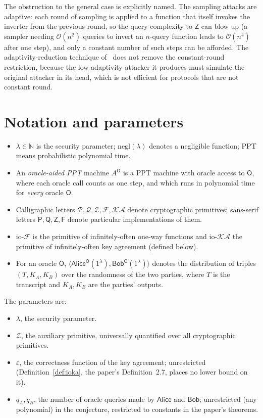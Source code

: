 \documentclass{aicr-conjecture}
\newcommand{\negl}{\mathrm{negl}}
\newcommand{\iopref}{\mathrm{io}\text{-}}
\newcommand{\Fc}{\mathcal{F}}
\newcommand{\KAc}{\mathcal{KA}}
\newcommand{\ioF}{\iopref\Fc}
\newcommand{\ioKA}{\iopref\KAc}
\newcommand{\Zc}{\mathcal{Z}}
\newcommand{\Pc}{\mathcal{P}}
\newcommand{\Qc}{\mathcal{Q}}
\newcommand{\Oc}{\mathsf{O}}
\newcommand{\Fs}{\mathsf{F}}
\newcommand{\Ps}{\mathsf{P}}
\newcommand{\Qs}{\mathsf{Q}}
\newcommand{\Zs}{\mathsf{Z}}
\newcommand{\Alice}{\mathsf{Alice}}
\newcommand{\Bob}{\mathsf{Bob}}
\newcommand{\kaexec}{\langle\Alice^{\Oc}(1^{\lambda}),\Bob^{\Oc}(1^{\lambda})\rangle}
\begin{document}
The obstruction to the general case is explicitly named. The sampling
attacks are adaptive: each round of sampling is applied to a function
that itself invokes the inverter from the previous round, so the query
complexity to $\Zs$ can blow up (a sampler needing $\mathcal O(n^2)$
queries to invert an $n$-query function leads to $\mathcal O(n^4)$ after
one step), and only a constant number of such steps can be afforded. The
adaptivity-reduction technique of~\cite{MMV11} does not remove the
constant-round restriction, because the low-adaptivity attacker it
produces must simulate the original attacker in its head, which is not
efficient for protocols that are not constant round.

\section{Notation and parameters}\label{sec:notation}

\begin{itemize}
\item $\lambda\in\mathbb{N}$ is the security parameter; $\negl(\lambda)$
  denotes a negligible function; PPT means probabilistic polynomial time.
\item An \emph{oracle-aided PPT} machine $A^{\Oc}$ is a PPT machine with
  oracle access to $\Oc$, where each oracle call counts as one step, and
  which runs in polynomial time for \emph{every} oracle $\Oc$.
\item Calligraphic letters $\Pc,\Qc,\Zc,\Fc,\KAc$ denote cryptographic
  primitives; sans-serif letters $\Ps,\Qs,\Zs,\Fs$ denote particular
  implementations of them.
\item $\ioF$ is the primitive of infinitely-often one-way functions and
  $\ioKA$ the primitive of infinitely-often key agreement (defined
  below).
\item For an oracle $\Oc$, $\kaexec$ denotes the distribution of triples
  $(T,K_A,K_B)$ over the randomness of the two parties, where $T$ is the
  transcript and $K_A,K_B$ are the parties' outputs.
\end{itemize}

The parameters are:
\begin{itemize}
\item $\lambda$, the security parameter.
\item $\Zc$, the auxiliary primitive, universally quantified over all
  cryptographic primitives.
\item $\varepsilon$, the correctness function of the key agreement;
  unrestricted (Definition~\ref{def:ioka}, the paper's Definition~2.7,
  places no lower bound on it).
\item $q_A,q_B$, the number of oracle queries made by $\Alice$ and
  $\Bob$; unrestricted (any polynomial) in the conjecture, restricted to
  constants in the paper's theorems.
\end{itemize}
\end{document}
